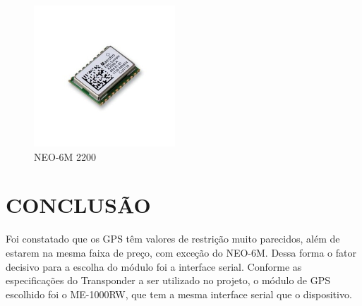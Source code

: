  \begin{figure}[h]
   \centering
   \includegraphics[width=200px, scale=1]{figuras/gps_neo_6m}
   \caption{NEO-6M 2200  \cite{16gps}}
 \label{fig:gps_neo_6m}
 \end{figure}

\section{CONCLUSÃO}

Foi constatado que os GPS têm valores de restrição muito parecidos, além de
estarem na mesma faixa de preço, com exceção do NEO-6M. Dessa forma o fator
decisivo para a escolha do módulo foi a interface serial. Conforme as
especificações do Transponder a ser utilizado no projeto, o módulo de GPS
  escolhido foi o ME-1000RW, que tem a mesma interface serial que o dispositivo.
